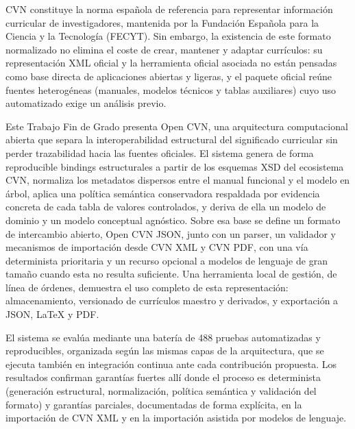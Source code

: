 CVN constituye la norma española de referencia para representar
información curricular de investigadores, mantenida por la Fundación
Española para la Ciencia y la Tecnología (FECYT). Sin embargo, la
existencia de este formato normalizado no elimina el coste de crear,
mantener y adaptar currículos: su representación XML oficial y la
herramienta oficial asociada no están pensadas como base directa de
aplicaciones abiertas y ligeras, y el paquete oficial reúne fuentes
heterogéneas (manuales, modelos técnicos y tablas auxiliares) cuyo uso
automatizado exige un análisis previo.

Este Trabajo Fin de Grado presenta Open CVN, una arquitectura
computacional abierta que separa la interoperabilidad estructural del
significado curricular sin perder trazabilidad hacia las fuentes
oficiales. El sistema genera de forma reproducible bindings estructurales
a partir de los esquemas XSD del ecosistema CVN, normaliza los metadatos
dispersos entre el manual funcional y el modelo en árbol, aplica una
política semántica conservadora respaldada por evidencia concreta de cada
tabla de valores controlados, y deriva de ella un modelo de dominio y un
modelo conceptual agnóstico. Sobre esa base se define un formato de
intercambio abierto, Open CVN JSON, junto con un parser, un validador y
mecanismos de importación desde CVN XML y CVN PDF, con una vía
determinista prioritaria y un recurso opcional a modelos de lenguaje de
gran tamaño cuando esta no resulta suficiente. Una herramienta local de
gestión, de línea de órdenes, demuestra el uso completo de esta
representación: almacenamiento, versionado de currículos maestro y
derivados, y exportación a JSON, LaTeX y PDF.

El sistema se evalúa mediante una batería de 488 pruebas automatizadas y
reproducibles, organizada según las mismas capas de la arquitectura, que
se ejecuta también en integración continua ante cada contribución
propuesta. Los resultados confirman garantías fuertes allí donde el
proceso es determinista (generación estructural, normalización, política
semántica y validación del formato) y garantías parciales, documentadas
de forma explícita, en la importación de CVN XML y en la importación
asistida por modelos de lenguaje.

\cleardoublepage
\thispagestyle{plain}
\vspace*{4cm}
\begin{center}
\Large{}
\end{center}
\vskip0.5cm

\lipsum[1]